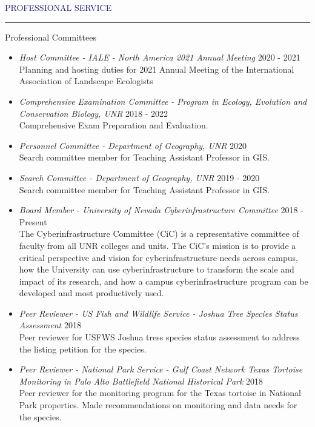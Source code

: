 \documentclass{resume} %
\renewenvironment{rSection}[1]{
\sectionskip
\textcolor{MidnightBlue}{\MakeUppercase{#1}}
\sectionlineskip
\hrule
\begin{list}{}{
\setlength{\leftmargin}{1.5em}
}
\item[]
}{
\end{list}
}
\begin{document}
\begin{rSection}{Professional Service}
\begin{rSubsection}{Professional Committees}{}{}{}
\begin{itemize}

\item \textit{Host Committee - IALE - North America 2021 Annual Meeting} \hfill 2020 - 2021 \\
Planning and hosting duties for 2021 Annual Meeting of the International Association of Landscape Ecologists
\item \textit{Comprehensive Examination Committee - Program in Ecology, Evolution and Conservation Biology, UNR} \hfill 2018 - 2022 \\
Comprehensive Exam Preparation and Evaluation.
\item \textit{Personnel Committee - Department of Geography, UNR} \hfill 2020 \\
Search committee member for Teaching Assistant Professor in GIS.
\item \textit{Search Committee - Department of Geography, UNR} \hfill 2019 - 2020 \\
Search committee member for Teaching Assistant Professor in GIS.
\item \textit{Board Member - University of Nevada Cyberinfrastructure Committee} \hfill 2018 - Present \\
The Cyberinfrastructure Committee (CiC) is a representative committee of faculty from all UNR colleges and units. The CiC's mission is to provide a critical perspective and vision for cyberinfrastructure needs across campus, how the University can use cyberinfrastructure to transform the scale and impact of its research, and how a campus cyberinfrastructure program can be developed and most productively used.

\item \textit{Peer Reviewer - US Fish and Wildlife Service - Joshua Tree Species Status Assessment} \hfill 2018 \\
Peer reviewer for USFWS Joshua tress species status assessment to address the listing petition for the species. 
\item \textit{Peer Reviewer - National Park Service - Gulf Coast Network Texas Tortoise Monitoring in Palo Alto Battlefield National Historical Park
} \hfill 2018 \\
Peer reviewer for the monitoring program for the Texas tortoise in National Park properties. Made recommendations on monitoring and data needs for the species.


\end{itemize}
\end{rSubsection}
\end{rSection}
\end{document}
